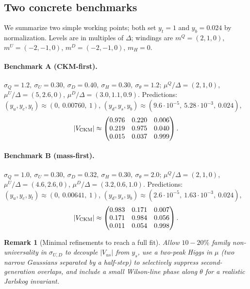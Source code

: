\documentclass[11pt]{article}
\newtheorem{remark}{Remark}
\begin{document}
\subsection{Two concrete benchmarks}
We summarize two simple working points; both set \(y_t=1\) and \(y_b=0.024\) by normalization.
Levels are in multiples of \(\Delta\); windings are \(m^Q=(2,1,0)\), \(m^U=(-2,-1,0)\), \(m^D=(-2,-1,0)\), \(m_H=0\).

\paragraph{Benchmark A (CKM-first).}
\(\sigma_Q=1.2,\ \sigma_U=0.30,\ \sigma_D=0.40,\ \sigma_H=0.30,\ \sigma_\theta=1.2\);
\(\mu^Q/\Delta=(2,1,0)\), \(\mu^U/\Delta=(5,2.6,0)\), \(\mu^D/\Delta=(3.0,1.1,0.9)\).
Predictions:
\((y_u,y_c,y_t)\approx(0,\ 0.00760,\ 1)\), \((y_d,y_s,y_b)\approx(9.6\cdot 10^{-5},\ 5.28\cdot 10^{-3},\ 0.024)\),
\begin{equation*}
|V_{\rm CKM}|\approx
\begin{pmatrix}
0.976 & 0.220 & 0.006\\
0.219 & 0.975 & 0.040\\
0.015 & 0.037 & 0.999
\end{pmatrix}.
\end{equation*}

\paragraph{Benchmark B (mass-first).}
\(\sigma_Q=1.0,\ \sigma_U=0.30,\ \sigma_D=0.32,\ \sigma_H=0.30,\ \sigma_\theta=2.0\);
\(\mu^Q/\Delta=(2,1,0)\), \(\mu^U/\Delta=(4.6,2.6,0)\), \(\mu^D/\Delta=(3.2,0.6,1.0)\).
Predictions:
\((y_u,y_c,y_t)\approx(0,\ 0.00641,\ 1)\), \((y_d,y_s,y_b)\approx(2.6\cdot 10^{-5},\ 1.63\cdot 10^{-3},\ 0.024)\),
\begin{equation*}
|V_{\rm CKM}|\approx
\begin{pmatrix}
0.983 & 0.171 & 0.007\\
0.171 & 0.984 & 0.056\\
0.011 & 0.054 & 0.998
\end{pmatrix}.
\end{equation*}

\begin{remark}[Minimal refinements to reach a full fit]
Allow \(10\!-\!20\%\) family non-universality in \(\sigma_{U,D}\) to decouple \(|V_{us}|\) from \(y_s\), use a two-peak Higgs in \(\mu\) (two narrow Gaussians separated by a half-step) to selectively suppress second-generation overlaps, and include a small Wilson-line phase along \(\theta\) for a realistic Jarlskog invariant.
\end{remark}
\end{document}
